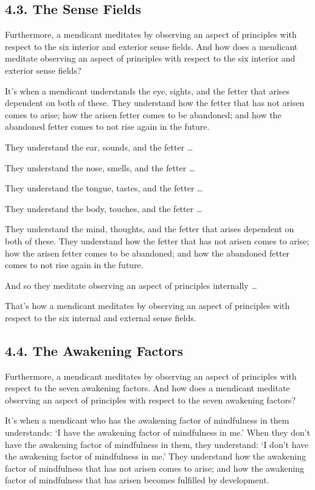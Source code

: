 \documentclass[12pt,openany]{book}%
\begin{document}
\subsection*{4.3. The Sense Fields }

Furthermore, a mendicant meditates by observing an aspect of principles with respect to the six interior and exterior sense fields. And how does a mendicant meditate observing an aspect of principles with respect to the six interior and exterior sense fields? 

It’s when a mendicant understands the eye, sights, and the fetter that arises dependent on both of these. They understand how the fetter that has not arisen comes to arise; how the arisen fetter comes to be abandoned; and how the abandoned fetter comes to not rise again in the future. 

They understand the ear, sounds, and the fetter … 

They understand the nose, smells, and the fetter … 

They understand the tongue, tastes, and the fetter … 

They understand the body, touches, and the fetter … 

They understand the mind, thoughts, and the fetter that arises dependent on both of these. They understand how the fetter that has not arisen comes to arise; how the arisen fetter comes to be abandoned; and how the abandoned fetter comes to not rise again in the future. 

And so they meditate observing an aspect of principles internally … 

That’s how a mendicant meditates by observing an aspect of principles with respect to the six internal and external sense fields. 

\subsection*{4.4. The Awakening Factors }

Furthermore, a mendicant meditates by observing an aspect of principles with respect to the seven awakening factors. And how does a mendicant meditate observing an aspect of principles with respect to the seven awakening factors? 

It’s when a mendicant who has the awakening factor of mindfulness in them understands: ‘I have the awakening factor of mindfulness in me.’ When they don’t have the awakening factor of mindfulness in them, they understand: ‘I don’t have the awakening factor of mindfulness in me.’ They understand how the awakening factor of mindfulness that has not arisen comes to arise; and how the awakening factor of mindfulness that has arisen becomes fulfilled by development. 
\end{document}
